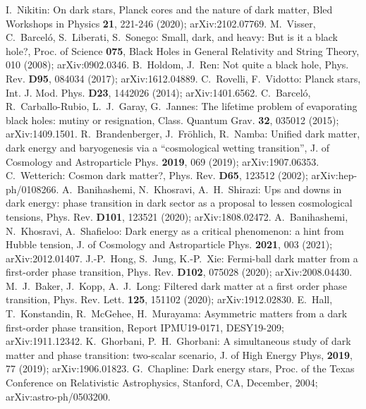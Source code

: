 \documentclass{article}
\begin{document}
\normalsize

\begin{thebibliography}{99}
I.~Nikitin: On dark stars, Planck cores and the nature of dark matter, Bled Workshops in Physics \textbf{21}, 221-246 (2020); arXiv:2102.07769.
M.~Visser, C.~Barceló, S.~Liberati, S.~Sonego: Small, dark, and heavy: But is it a black hole?, Proc. of Science \textbf{075}, Black Holes in General Relativity and String Theory, 010 (2008); arXiv:0902.0346.
B.~Holdom, J.~Ren: Not quite a black hole, Phys. Rev. \textbf{D95}, 084034 (2017); arXiv:1612.04889.
C.~Rovelli, F.~Vidotto: Planck stars, Int. J. Mod. Phys. \textbf{D23}, 1442026 (2014); arXiv:1401.6562.
C.~Barceló, R.~Carballo-Rubio, L.~J.~Garay, G.~Jannes: The lifetime problem of evaporating black holes: mutiny or resignation, Class. Quantum Grav. \textbf{32}, 035012 (2015); arXiv:1409.1501.
R.~Brandenberger, J.~Fröhlich, R.~Namba: Unified dark matter, dark energy and baryogenesis via a ``cosmological wetting transition'', J. of Cosmology and Astroparticle Phys. \textbf{2019}, 069 (2019); arXiv:1907.06353.
C.~Wetterich: Cosmon dark matter?, Phys. Rev. \textbf{D65}, 123512 (2002); arXiv:hep-ph/0108266.
A.~Banihashemi, N.~Khosravi, A.~H.~Shirazi: Ups and downs in dark energy: phase transition in dark sector as a proposal to lessen cosmological tensions, Phys. Rev. \textbf{D101}, 123521 (2020); arXiv:1808.02472.
A.~Banihashemi, N.~Khosravi, A.~Shafieloo: Dark energy as a critical phenomenon: a hint from Hubble tension, J. of Cosmology and Astroparticle Phys. \textbf{2021}, 003 (2021); arXiv:2012.01407.
J.-P.~Hong, S.~Jung, K.-P.~Xie: Fermi-ball dark matter from a first-order phase transition, Phys. Rev. \textbf{D102}, 075028 (2020); arXiv:2008.04430.
M.~J.~Baker, J.~Kopp, A.~J.~Long: Filtered dark matter at a first order phase transition, Phys. Rev. Lett. \textbf{125}, 151102 (2020); arXiv:1912.02830.
E.~Hall, T.~Konstandin, R.~McGehee, H.~Murayama: Asymmetric matters from a dark first-order phase transition, Report IPMU19-0171, DESY19-209; arXiv:1911.12342.
K.~Ghorbani, P.~H.~Ghorbani: A simultaneous study of dark matter and phase transition: two-scalar scenario, J. of High Energy Phys, \textbf{2019}, 77 (2019); arXiv:1906.01823.
G.~Chapline: Dark energy stars, Proc. of the Texas Conference on Relativistic Astrophysics, Stanford, CA, December, 2004; arXiv:astro-ph/0503200.

\end{thebibliography}
\end{document}
